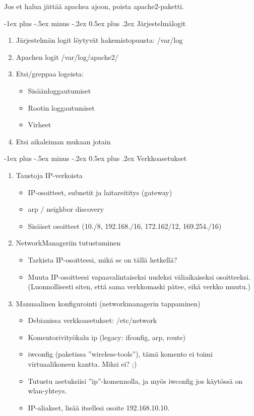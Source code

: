 \documentclass[12pt,portrait,a4]{article}
\makeatletter
\renewcommand{\section}{\@startsection{section}{1}{0mm}%
                                {-1ex plus -.5ex minus -.2ex}%
                                {0.5ex plus .2ex}%
                                {\normalfont\large\bfseries}}
\makeatother
\begin{document}
Jos et halua jättää apachea ajoon, poista apache2-paketti.

\section{Järjestelmälogit}

\begin{enumerate}
\item Järjestelmän logit löytyvät hakemistopuusta: /var/log
\item Apachen logit /var/log/apache2/
\item Etsi/greppaa logeista:
	\begin{itemize}
	\item Sisäänloggautumiset
	\item Rootin loggautumiset
	\item Virheet
	\end{itemize}
\item Etsi aikaleiman mukaan jotain
\end{enumerate}

\section{Verkkoasetukset}

\begin{enumerate}
\item Taustoja IP-verkoista
	\begin{itemize}
	\item IP-osoitteet, subnetit ja laitareititys (gateway)
	\item arp / neighbor discovery
	\item Sisäiset osoitteet (10./8, 192.168./16, 172.162/12, 169.254./16)
	\end{itemize}
\item NetworkManageriin tutustuminen
	\begin{itemize}
	\item Tarkista IP-osoitteesi, mikä se on tällä hetkellä?
	\item Muuta IP-osoitteesi vapaavalintaiseksi uudeksi väliaikaiseksi osoitteeksi. (Luonnollisesti siten, että sama verkkomaski pätee, eikä verkko muutu.)
	\end{itemize}
\item Manuaalinen konfigurointi (networkmanagerin tappaminen)
	\begin{itemize}
	\item Debianissa verkkoasetukset: /etc/network
	\item Komentorivityökalu ip (legacy: ifconfig, arp, route)
	\item iwconfig (paketissa ''wireless-tools''), tämä komento ei toimi virtuaalikoneen kantta. Miksi ei? ;)
	\item Tutustu asetuksiisi ''ip''-komennolla, ja myös iwconfig jos
	käytössä on wlan-yhteys.
	\item IP-aliakset, lisää itsellesi osoite 192.168.10.10.
	\end{itemize}
\end{enumerate}
\end{document}
